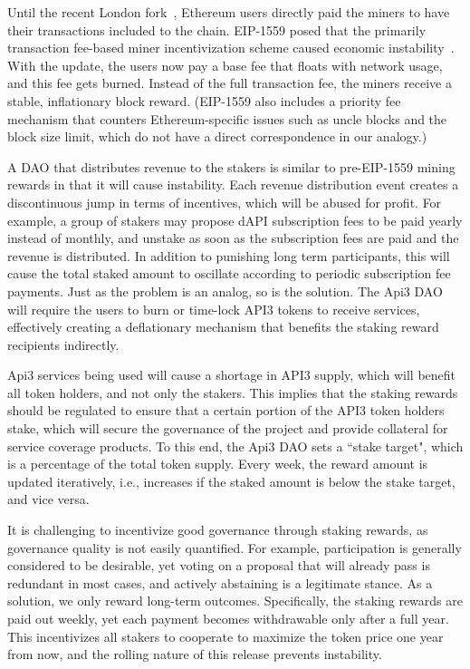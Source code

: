 \documentclass[11pt]{article}
\begin{document}
Until the recent London fork~\cite{london}, Ethereum users directly paid the miners to have their transactions included to the chain.
EIP-1559 posed that the primarily transaction fee-based miner incentivization scheme caused economic instability~\cite{roughgarden:2020}.
With the update, the users now pay a base fee that floats with network usage, and this fee gets burned.
Instead of the full transaction fee, the miners receive a stable, inflationary block reward.
(EIP-1559 also includes a priority fee mechanism that counters Ethereum-specific issues such as uncle blocks and the block size limit, which do not have a direct correspondence in our analogy.)

A DAO that distributes revenue to the stakers is similar to pre-EIP-1559 mining rewards in that it will cause instability.
Each revenue distribution event creates a discontinuous jump in terms of incentives, which will be abused for profit.
For example, a group of stakers may propose dAPI subscription fees to be paid yearly instead of monthly, and unstake as soon as the subscription fees are paid and the revenue is distributed.
In addition to punishing long term participants, this will cause the total staked amount to oscillate according to periodic subscription fee payments.
Just as the problem is an analog, so is the solution.
The Api3 DAO will require the users to burn or time-lock API3 tokens to receive services, effectively creating a deflationary mechanism that benefits the staking reward recipients indirectly.

Api3 services being used will cause a shortage in API3 supply, which will benefit all token holders, and not only the stakers.
This implies that the staking rewards should be regulated to ensure that a certain portion of the API3 token holders stake, which will secure the governance of the project and provide collateral for service coverage products.
To this end, the Api3 DAO sets a ``stake target", which is a percentage of the total token supply.
Every week, the reward amount is updated iteratively, i.e., increases if the staked amount is below the stake target, and vice versa.

It is challenging to incentivize good governance through staking rewards, as governance quality is not easily quantified.
For example, participation is generally considered to be desirable, yet voting on a proposal that will already pass is redundant in most cases, and actively abstaining is a legitimate stance.
As a solution, we only reward long-term outcomes.
Specifically, the staking rewards are paid out weekly, yet each payment becomes withdrawable only after a full year.
This incentivizes all stakers to cooperate to maximize the token price one year from now, and the rolling nature of this release prevents instability.
\end{document}
